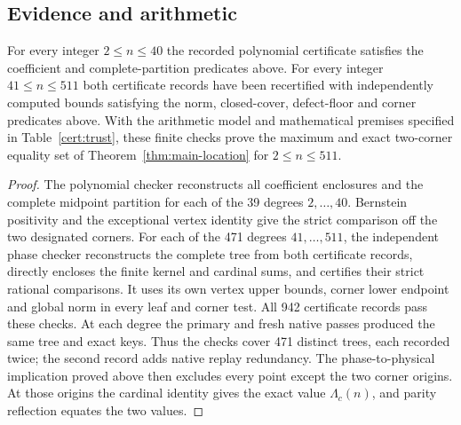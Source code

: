 \subsection{Evidence and arithmetic}
\begin{proposition}\label{cert:finite-verification}
For every integer $2\leq n\leq40$ the recorded polynomial certificate
satisfies the coefficient and complete-partition predicates above.
For every integer $41\leq n\leq511$ both certificate records have been
recertified with independently computed bounds satisfying the norm,
closed-cover, defect-floor and corner predicates above.
With the arithmetic model and mathematical premises specified in
Table~\ref{cert:trust}, these finite checks prove the maximum and exact
two-corner equality set of Theorem~\ref{thm:main-location} for
$2\leq n\leq511$.
\end{proposition}
\begin{proof}
The polynomial checker reconstructs all coefficient enclosures and the
complete midpoint partition for each of the 39 degrees $2,\ldots,40$.
Bernstein positivity and the exceptional vertex identity give the strict
comparison off the two designated corners.
For each of the 471 degrees $41,\ldots,511$, the independent phase checker
reconstructs the complete tree from both certificate records, directly encloses the finite kernel and
cardinal sums, and certifies their strict rational comparisons. It uses
its own vertex upper bounds, corner lower endpoint and global norm in
every leaf and corner test. All 942 certificate records pass these checks.
At each degree the primary and fresh native passes produced the same
tree and exact keys. Thus the checks cover 471 distinct trees, each
recorded twice; the second record adds native replay redundancy.
The phase-to-physical implication proved above then excludes every point
except the two corner origins. At those origins the cardinal identity
gives the exact value $\Lambda_c(n)$, and parity reflection equates the
two values.
\end{proof}

